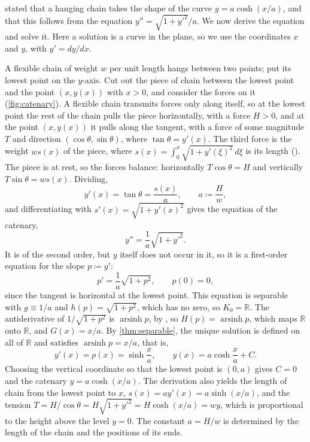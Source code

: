  stated that a hanging chain takes the shape of the curve $y=a\cosh(x/a)$, and that this follows from the equation $y''=\sqrt{1+y'^2}/a$. We now derive the equation and solve it. Here a solution is a curve in the plane, so we use the coordinates $x$ and $y$, with $y'=dy/dx$.

A flexible chain of weight $w$ per unit length hangs between two points; put its lowest point on the $y$-axis. Cut out the piece of chain between the lowest point and the point $(x,y(x))$ with $x>0$, and consider the forces on it (\cref{fig:catenary}). A flexible chain transmits forces only along itself, so at the lowest point the rest of the chain pulls the piece horizontally, with a force $H>0$, and at the point $(x,y(x))$ it pulls along the tangent, with a force of some magnitude $T$ and direction $(\cos\theta,\sin\theta)$, where $\tan\theta=y'(x)$. The third force is the weight $ws(x)$ of the piece, where $s(x)=\int_0^x\sqrt{1+y'(\xi)^2}\,d\xi$ is its length (). The piece is at rest, so the forces balance: horizontally $T\cos\theta=H$ and vertically $T\sin\theta=ws(x)$. Dividing,
\[
y'(x)=\tan\theta=\frac{s(x)}a,\qquad a\coloneqq\frac Hw ,
\]
and differentiating with $s'(x)=\sqrt{1+y'(x)^2}$ gives the equation of the catenary,
\begin{equation}
y''=\frac1a\sqrt{1+y'^2} .
\label{eq:catenary}
\end{equation}
It is of the second order, but $y$ itself does not occur in it, so it is a first-order equation for the slope $p\coloneqq y'$:
\[
p'=\frac1a\sqrt{1+p^2},\qquad p(0)=0 ,
\]
since the tangent is horizontal at the lowest point. This equation is separable with $g\equiv1/a$ and $h(p)=\sqrt{1+p^2}$, which has no zero, so $K_0=\mathbb R$. The antiderivative of $1/\sqrt{1+p^2}$ is $\operatorname{arsinh}p$, by , so $H(p)=\operatorname{arsinh}p$, which maps $\mathbb R$ onto $\mathbb R$, and $G(x)=x/a$. By \cref{thm:separable}, the unique solution is defined on all of $\mathbb R$ and satisfies $\operatorname{arsinh}p=x/a$, that is,
\[
y'(x)=p(x)=\sinh\frac xa,\qquad y(x)=a\cosh\frac xa+C .
\]
Choosing the vertical coordinate so that the lowest point is $(0,a)$ gives $C=0$ and the catenary $y=a\cosh(x/a)$. The derivation also yields the length of chain from the lowest point to $x$, $s(x)=ay'(x)=a\sinh(x/a)$, and the tension $T=H/\cos\theta=H\sqrt{1+y'^2}=H\cosh(x/a)=wy$, which is proportional to the height above the level $y=0$. The constant $a=H/w$ is determined by the length of the chain and the positions of its ends.

